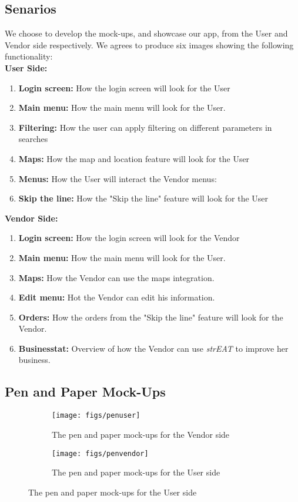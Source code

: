 \subsection{Senarios}
We choose to develop the mock-ups, and showcase our app, from the User and Vendor side respectively. We agrees to produce six images showing the following functionality: \\
\textbf{User Side:}
\begin{enumerate}
    \item \textbf{Login screen:} How the login screen will look for the User
    \item \textbf{Main menu:} How the main menu will look for the User.
    \item \textbf{Filtering:} How the user can apply filtering on different parameters in searches
    \item \textbf{Maps:} How the map and location feature will look for the User
    \item \textbf{Menus:} How the User will interact the Vendor menus:
    \item \textbf{Skip the line:} How the "Skip the line" feature will look for the User
\end{enumerate}
\textbf{Vendor Side:}
\begin{enumerate}
    \item \textbf{Login screen:} How the login screen will look for the Vendor
    \item \textbf{Main menu:} How the main menu will look for the User.
    \item \textbf{Maps:} How the Vendor can use the maps integration.
    \item \textbf{Edit menu:} Hot the Vendor can edit his information.
    \item \textbf{Orders:} How the orders from the "Skip the line" feature will look for the Vendor.
    \item \textbf{Businesstat:} Overview of how the Vendor can use \textit{strEAT} to improve her business.
\end{enumerate}

\subsection{Pen and Paper Mock-Ups}


\begin{figure}
   \centering
   \begin{subfigure}[b]{0.475\textwidth}
       \centering
       \texttt{[image: figs/penuser]}
       \caption{The pen and paper mock-ups for the Vendor side}
       \label{penvendor}
   \end{subfigure}
   \hfill
   \begin{subfigure}[b]{0.475\textwidth}
       \centering
       \texttt{[image: figs/penvendor]}
       \caption{The pen and paper mock-ups for the User side}
       \label{penuser}
   \end{subfigure}
\end{figure}

